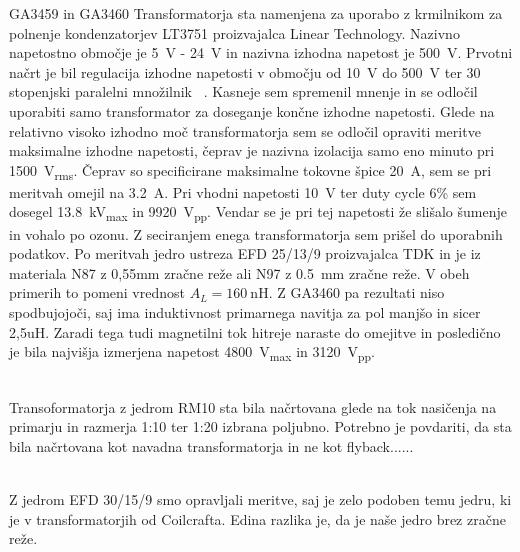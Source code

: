 \documentclass[a4paper,twoside,openright,12pt,slovene]{book}
\begin{document}
GA3459 in GA3460
Transformatorja sta namenjena za uporabo z krmilnikom za polnenje kondenzatorjev LT3751 proizvajalca Linear Technology. Nazivno napetostno območje je \SI{5}{\volt} - \SI{24}{\volt} in nazivna izhodna napetost je \SI{500}{\volt}. Prvotni načrt je bil regulacija izhodne napetosti v območju od \SI{10}{\volt} do \SI{500}{\volt} ter 30 stopenjski paralelni množilnik ~\cite{Using Parallel High Voltage Multipliers for 100kV Downhole Neutron Generator Power Supplies}. Kasneje sem spremenil mnenje in se odločil uporabiti samo transformator za doseganje končne izhodne napetosti. Glede na relativno visoko izhodno moč transformatorja sem se odločil opraviti meritve maksimalne izhodne napetosti, čeprav je nazivna izolacija samo eno minuto pri \SI{1500}{\volt_{rms}}. Čeprav so specificirane maksimalne tokovne špice \SI{20}{\ampere}, sem se pri meritvah omejil na \SI{3,2}{\ampere}. Pri vhodni napetosti \SI{10}{\volt} ter duty cycle 6\% sem dosegel \SI{13.8}{\kilo\volt_{max}} in \SI{9920}{\volt_{pp}}. Vendar se je pri tej napetosti že slišalo šumenje in vohalo po ozonu. Z seciranjem enega transformatorja sem prišel do uporabnih podatkov. Po meritvah jedro ustreza EFD 25/13/9 proizvajalca TDK in je iz materiala N87 z 0,55mm zračne reže ali N97 z \SI{0,5}{\milli\meter} zračne reže. V obeh primerih to pomeni vrednost \(A_{L}=\SI{160}{\nano\henry}\).  Z GA3460 pa rezultati niso spodbujojoči, saj ima induktivnost primarnega navitja za pol manjšo in sicer 2,5uH. Zaradi tega tudi magnetilni tok hitreje naraste do omejitve in posledično je bila najvišja izmerjena napetost \SI{4800}{\volt_{max}} in \SI{3120}{\volt_{pp}}.

    
~\\Transoformatorja z jedrom RM10 sta bila načrtovana glede na tok nasičenja na primarju in razmerja 1:10 ter 1:20 izbrana poljubno. Potrebno je povdariti, da sta bila načrtovana kot navadna transformatorja in ne kot flyback......

~
\\Z jedrom EFD 30/15/9 smo opravljali meritve, saj je zelo podoben temu jedru, ki je v transformatorjih od Coilcrafta. Edina razlika je, da je naše jedro brez zračne reže. 
\end{document}
